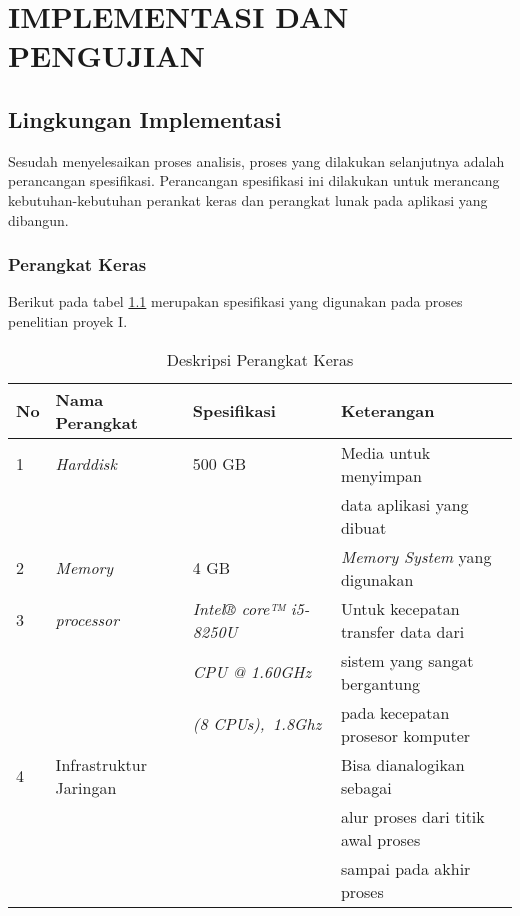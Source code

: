 \chapter{IMPLEMENTASI DAN PENGUJIAN}
\section{Lingkungan Implementasi}
\par
Sesudah menyelesaikan proses analisis, proses yang dilakukan selanjutnya adalah perancangan spesifikasi. Perancangan spesifikasi ini dilakukan untuk merancang kebutuhan-kebutuhan perankat keras dan perangkat lunak pada aplikasi yang dibangun.
\subsection{Perangkat Keras}
\par
Berikut pada tabel \ref{perangkatker} merupakan spesifikasi yang digunakan pada proses penelitian proyek I.

\begin{table}[!htbp]
\captionsetup{singlelinecheck=off}
\caption{Deskripsi Perangkat Keras}
\label{perangkatker}
\begin{tabular}{|l|l|l|l|}
\hline
No & Nama Perangkat & Spesifikasi & Keterangan \\
\hline

1 &  \textit{Harddisk} & 500 GB  & Media untuk menyimpan \\
 & & & data aplikasi yang dibuat  \\
\hline

2 &  \textit{Memory} & 4 GB & \textit{Memory System} yang digunakan  \\
\hline

3 &  \textit{processor} & \textit{Intel® core™ i5-8250U  } &  Untuk kecepatan transfer data dari \\

 & & \textit{CPU @ 1.60GHz} &  sistem yang sangat bergantung \\
 
 & &\textit{(8 CPUs),~1.8Ghz} & pada kecepatan prosesor komputer \\
\hline

4 &  Infrastruktur Jaringan &    & Bisa dianalogikan sebagai \\     & & &  alur proses dari titik awal proses \\
& & & sampai pada akhir proses  \\

\hline
\end{tabular}
\end{table}

